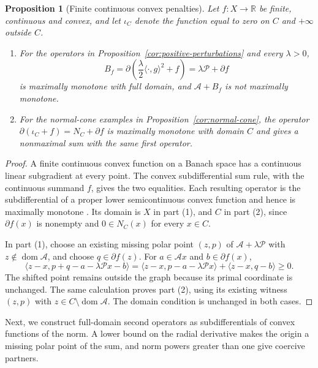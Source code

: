 \documentclass[11pt]{article}
\newcommand{\R}{\mathbb R}
\newcommand{\dom}{\operatorname{dom}}
\newcommand{\pair}[2]{\langle #1,#2\rangle}
\newtheorem{proposition}{Proposition}
\theoremstyle{definition}
\theoremstyle{remark}
\begin{document}
\begin{proposition}[Finite continuous convex penalties]
\label{cor:nonsmooth-penalties}
\label{cor:constrained-penalties}
Let $f:X\to\R$ be finite, continuous and convex, and let $\iota_C$ denote the function equal to zero on $C$ and $+\infty$ outside $C$.
\begin{enumerate}
\item For the operators in Proposition~\ref{cor:positive-perturbations} and every $\lambda>0$,
\[
B_f=\partial\left(\frac\lambda2\pair{\cdot}{g}^2+f\right)=\lambda\mathcal P+\partial f
\]
is maximally monotone with full domain, and $\mathcal A+B_f$ is not maximally monotone.
\item For the normal-cone examples in Proposition~\ref{cor:normal-cone}, the operator $\partial(\iota_C+f)=N_C+\partial f$ is maximally monotone with domain $C$ and gives a nonmaximal sum with the same first operator.
\end{enumerate}
\end{proposition}
\begin{proof}
A finite continuous convex function on a Banach space has a continuous linear subgradient at every point. The convex subdifferential sum rule, with the continuous summand $f$, gives the two equalities. Each resulting operator is the subdifferential of a proper lower semicontinuous convex function and hence is maximally monotone \cite{rockafellar1970subdiff}. Its domain is $X$ in part (1), and $C$ in part (2), since $\partial f(x)$ is nonempty and $0\in N_C(x)$ for every $x\in C$.

In part (1), choose an existing missing polar point $(z,p)$ of $\mathcal A+\lambda\mathcal P$ with $z\notin\dom\mathcal A$, and choose $q\in\partial f(z)$. For $a\in\mathcal A x$ and $b\in\partial f(x)$,
\[
\pair{z-x}{p+q-a-\lambda\mathcal Px-b}
=\pair{z-x}{p-a-\lambda\mathcal Px}+\pair{z-x}{q-b}\ge0.
\]
The shifted point remains outside the graph because its primal coordinate is unchanged. The same calculation proves part (2), using its existing witness $(z,p)$ with $z\in C\setminus\dom\mathcal A$. The domain condition is unchanged in both cases.
\end{proof}

Next, we construct full-domain second operators as subdifferentials of convex functions of the norm. A lower bound on the radial derivative makes the origin a missing polar point of the sum, and norm powers greater than one give coercive partners.
\end{document}
